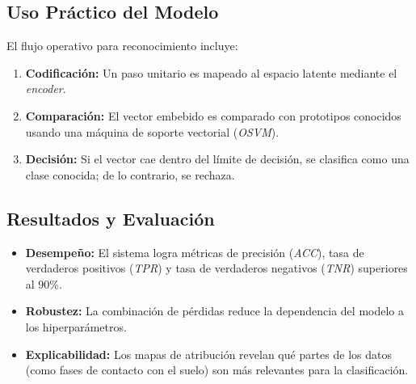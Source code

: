 \documentclass{report}
\begin{document}
\subsection{Uso Práctico del Modelo}
El flujo operativo para reconocimiento incluye:
\begin{enumerate}
    \item \textbf{Codificación:} Un paso unitario es mapeado al espacio latente mediante el \textit{encoder}.
    \item \textbf{Comparación:} El vector embebido es comparado con prototipos conocidos usando una máquina de soporte vectorial (\textit{OSVM}).
    \item \textbf{Decisión:} Si el vector cae dentro del límite de decisión, se clasifica como una clase conocida; de lo contrario, se rechaza.
\end{enumerate}


\subsection{Resultados y Evaluación}
\begin{itemize}
    \item \textbf{Desempeño:} El sistema logra métricas de precisión (\textit{ACC}), tasa de verdaderos positivos (\textit{TPR}) y tasa de verdaderos negativos (\textit{TNR}) superiores al 90\%.
    \item \textbf{Robustez:} La combinación de pérdidas reduce la dependencia del modelo a los hiperparámetros.
    \item \textbf{Explicabilidad:} Los mapas de atribución revelan qué partes de los datos (como fases de contacto con el suelo) son más relevantes para la clasificación.
\end{itemize}
\end{document}
